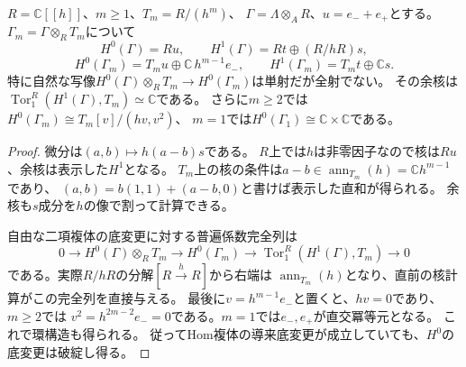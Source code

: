 \begin{proposition}[底変更で生じる一つのTor方向]\label{asl:prop:tor}
$R=\mathbb C[[h]]$、$m\ge1$、$T_m=R/(h^m)$、
$\Gamma=\Lambda\otimes_A R$、$u=e_-+e_+$とする。
$\Gamma_m=\Gamma\otimes_R T_m$について
\[
 H^0(\Gamma)=Ru,\qquad H^1(\Gamma)=Rt\oplus(R/hR)s,
\]
\[
 H^0(\Gamma_m)=T_m u\oplus\mathbb C\,h^{m-1}e_-,\qquad
 H^1(\Gamma_m)=T_m t\oplus\mathbb C s.
\]
特に自然な写像$H^0(\Gamma)\otimes_R T_m\to H^0(\Gamma_m)$は単射だが全射でない。
その余核は$\operatorname{Tor}_1^R(H^1(\Gamma),T_m)\simeq\mathbb C$である。
さらに$m\ge2$では$H^0(\Gamma_m)\cong T_m[v]/(hv,v^2)$、
$m=1$では$H^0(\Gamma_1)\cong\mathbb C\times\mathbb C$である。
\end{proposition}
\begin{proof}
微分は$(a,b)\mapsto h(a-b)s$である。
$R$上では$h$は非零因子なので核は$Ru$、余核は表示した$H^1$となる。
$T_m$上の核の条件は$a-b\in\operatorname{ann}_{T_m}(h)=\mathbb C h^{m-1}$であり、
$(a,b)=b(1,1)+(a-b,0)$と書けば表示した直和が得られる。
余核も$s$成分を$h$の像で割って計算できる。

自由な二項複体の底変更に対する普遍係数完全列は
\[
0\longrightarrow H^0(\Gamma)\otimes_R T_m
\longrightarrow H^0(\Gamma_m)
\longrightarrow\operatorname{Tor}_1^R(H^1(\Gamma),T_m)
\longrightarrow0
\]
である。実際$R/hR$の分解$[R\xrightarrow{h}R]$から右端は
$\operatorname{ann}_{T_m}(h)$となり、直前の核計算がこの完全列を直接与える。
最後に$v=h^{m-1}e_-$と置くと、$hv=0$であり、$m\ge2$では
$v^2=h^{2m-2}e_-=0$である。$m=1$では$e_-,e_+$が直交冪等元となる。
これで環構造も得られる。
従ってHom複体の導来底変更が成立していても、$H^0$の底変更は破綻し得る。
\end{proof}
